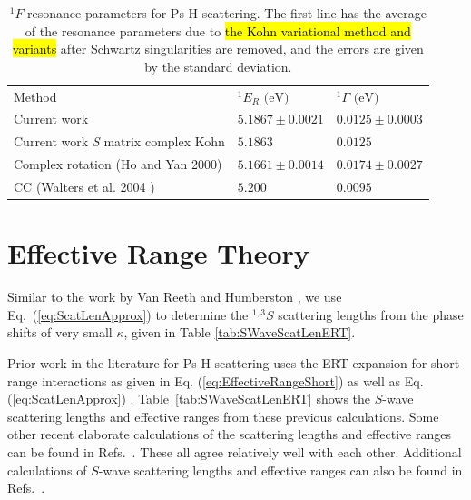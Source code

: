 \documentclass[preprint,showpacs,showkeys,preprintnumbers,amsmath,amssymb,longbibliography,pra,aps]{revtex4-1}
\begin{document}
{\begin{table}[H]
\begin{center}
\begin{ruledtabular}
\begin{tabular}{l l l}
Method & $^1E_R \text{ (eV)}$ & $^1\Gamma \text{ (eV)}$ \\
\colrule
Current work & $5.1867 \pm 0.0021$ & $0.0125 \pm 0.0003$ \\
Current work \emph{S} matrix complex Kohn & $5.1863$ & $0.0125$ \\
Complex rotation (Ho and Yan 2000) \cite{Ho2000} & $5.1661 \pm 0.0014$ & $0.0174 \pm 0.0027$  \\
CC (Walters et al. 2004 \cite{Walters2004}) & $5.200$ & $0.0095$ \\
\end{tabular}
\end{ruledtabular}
\caption{$^1F$ resonance parameters for Ps-H scattering. The first line has the average of the resonance parameters
due to \hl{the Kohn variational method and variants} after Schwartz singularities
are removed, and the errors are given by the standard deviation.}
\label{tab:FWaveResonances}
\end{center}
\end{table}



\section{Effective Range Theory}

Similar to the work by Van Reeth and Humberston \cite{VanReeth2003}, we use 
Eq.~(\ref{eq:ScatLenApprox}) to determine
the $^{1,3}S$ scattering lengths from the phase shifts of very
small $\kappa$, given in Table \ref{tab:SWaveScatLenERT}. %

Prior work in the literature for Ps-H scattering
\cite{Blackwood2002,Ivanov2002,Walters2004,VanReeth2003}
uses the ERT expansion for short-range 
interactions as given in Eq. (\ref{eq:EffectiveRangeShort})
as well as Eq. (\ref{eq:ScatLenApprox}) \cite{VanReeth2003}.
Table~\ref{tab:SWaveScatLenERT}
shows the $S$-wave scattering lengths and effective ranges from these
previous calculations. Some other recent elaborate
calculations of the scattering lengths and effective ranges can be found in
Refs.~\cite{Sinha2000,Ivanov2001,Chiesa2002,Ivanov2002}.
These all agree relatively well with each 
other. Additional calculations of $S$-wave scattering lengths and effective 
ranges can also be found in
Refs.~\cite{Hara1975,Page1976,Drachman1975,
Drachman1976,Campbell1998,Adhikari1999,Adhikari2001b}.

}
\end{document}
